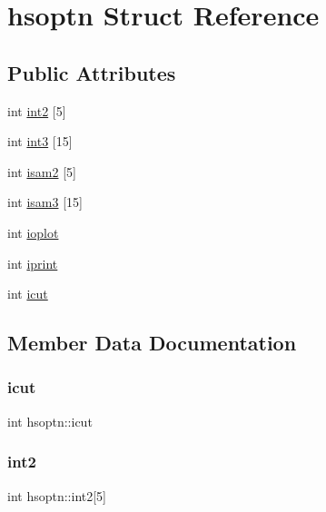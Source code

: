 \hypertarget{structhsoptn}{}\section{hsoptn Struct Reference}
\label{structhsoptn}
\subsection*{Public Attributes}
\begin{DoxyCompactItemize}
\item 
int \hyperlink{structhsoptn_a7f191c3093740fd3488565b475d2ae4b}{int2} \mbox{[}5\mbox{]}
\item 
int \hyperlink{structhsoptn_aad52dcd6b5df74e9db164a44c7c3d001}{int3} \mbox{[}15\mbox{]}
\item 
int \hyperlink{structhsoptn_ab859afeb8909136551c464c4cde1f37e}{isam2} \mbox{[}5\mbox{]}
\item 
int \hyperlink{structhsoptn_a31ff1c9d49ed6b3a1cffca02a50c08c9}{isam3} \mbox{[}15\mbox{]}
\item 
int \hyperlink{structhsoptn_a0b5585fb41fe026d95451bfc65e956a0}{ioplot}
\item 
int \hyperlink{structhsoptn_a09ad05633ee63e8919e70ce554f7d160}{iprint}
\item 
int \hyperlink{structhsoptn_a9ee904c7cd47b4bdc2bb8dd637cf321a}{icut}
\end{DoxyCompactItemize}


\subsection{Member Data Documentation}
\mbox{\label{structhsoptn_a9ee904c7cd47b4bdc2bb8dd637cf321a}} 
\subsubsection{\texorpdfstring{icut}{icut}}
{\footnotesize\ttfamily int hsoptn\+::icut}

\mbox{\label{structhsoptn_a7f191c3093740fd3488565b475d2ae4b}} 
\subsubsection{\texorpdfstring{int2}{int2}}
{\footnotesize\ttfamily int hsoptn\+::int2\mbox{[}5\mbox{]}}

